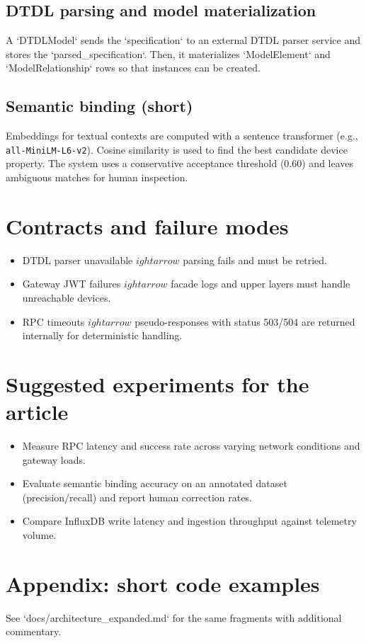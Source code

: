 \documentclass[11pt]{article}
\begin{document}
\subsection*{DTDL parsing and model materialization}
A `DTDLModel` sends the `specification` to an external DTDL parser service and stores the `parsed_specification`. Then, it materializes `ModelElement` and `ModelRelationship` rows so that instances can be created.

\subsection*{Semantic binding (short)}
Embeddings for textual contexts are computed with a sentence transformer (e.g., \texttt{all-MiniLM-L6-v2}). Cosine similarity is used to find the best candidate device property. The system uses a conservative acceptance threshold (0.60) and leaves ambiguous matches for human inspection.

\section{Contracts and failure modes}
\begin{itemize}
  \item DTDL parser unavailable $
ightarrow$ parsing fails and must be retried.
  \item Gateway JWT failures $
ightarrow$ facade logs and upper layers must handle unreachable devices.
  \item RPC timeouts $
ightarrow$ pseudo-responses with status 503/504 are returned internally for deterministic handling.
\end{itemize}

\section{Suggested experiments for the article}
\begin{itemize}
  \item Measure RPC latency and success rate across varying network conditions and gateway loads.
  \item Evaluate semantic binding accuracy on an annotated dataset (precision/recall) and report human correction rates.
  \item Compare InfluxDB write latency and ingestion throughput against telemetry volume.
\end{itemize}

\section{Appendix: short code examples}
See `docs/architecture_expanded.md` for the same fragments with additional commentary.
\end{document}
